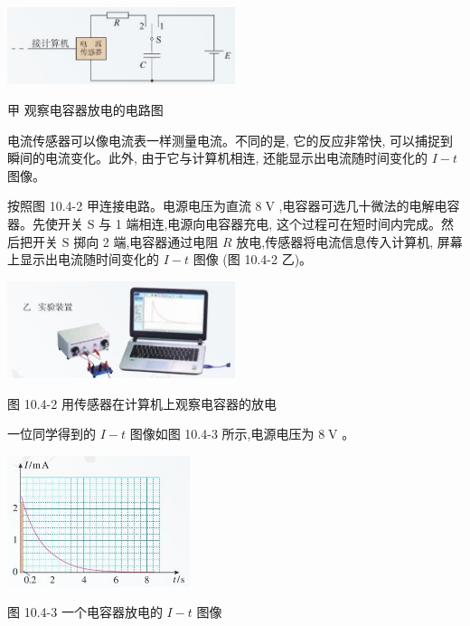 \documentclass[10pt]{article}
\begin{document}
\begin{center}
\includegraphics[max width=0.5\textwidth]{images/01911d5f-8e38-70c0-b5b8-2b399bd115b6_44_321482.jpg}
\end{center}

甲 观察电容器放电的电路图

电流传感器可以像电流表一样测量电流。不同的是, 它的反应非常快, 可以捕捉到瞬间的电流变化。此外, 由于它与计算机相连, 还能显示出电流随时间变化的 \(I - t\) 图像。

按照图 10.4-2 甲连接电路。电源电压为直流 \(8\mathrm{\;V}\) ,电容器可选几十微法的电解电容器。先使开关 \(\mathrm{S}\) 与 1 端相连,电源向电容器充电, 这个过程可在短时间内完成。然后把开关 \(\mathrm{S}\) 掷向 2 端,电容器通过电阻 \(R\) 放电,传感器将电流信息传入计算机, 屏幕上显示出电流随时间变化的 \(I - t\) 图像 (图 10.4-2 乙)。

\begin{center}
\includegraphics[max width=0.5\textwidth]{images/01911d5f-8e38-70c0-b5b8-2b399bd115b6_44_106395.jpg}
\end{center}

图 10.4-2 用传感器在计算机上观察电容器的放电

一位同学得到的 \(I - t\) 图像如图 10.4-3 所示,电源电压为 \(8\mathrm{\;V}\) 。

\begin{center}
\includegraphics[max width=0.4\textwidth]{images/01911d5f-8e38-70c0-b5b8-2b399bd115b6_44_869676.jpg}
\end{center}

图 10.4-3 一个电容器放电的 \(I - t\) 图像
\end{document}
